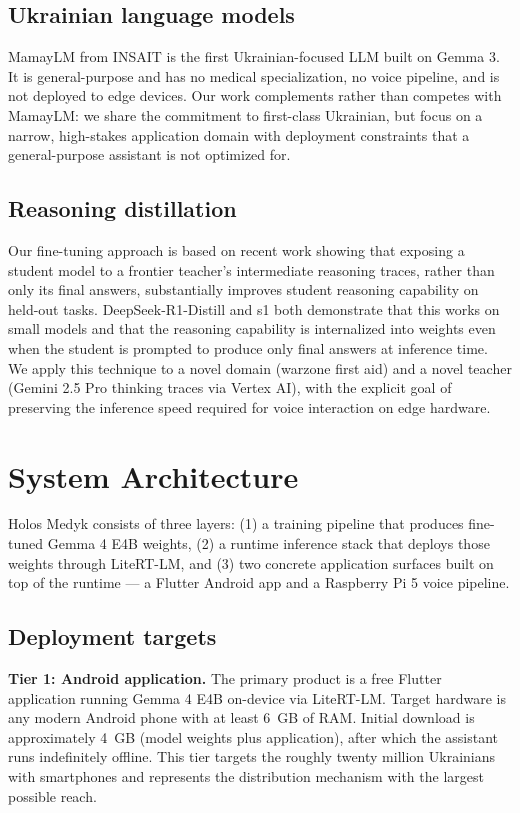 \documentclass{article}
\theoremstyle{plain}
\theoremstyle{definition}
\theoremstyle{remark}
\begin{document}
\subsection{Ukrainian language models}

MamayLM from INSAIT is the first Ukrainian-focused LLM built on Gemma 3. It is general-purpose and has no medical specialization, no voice pipeline, and is not deployed to edge devices. Our work complements rather than competes with MamayLM: we share the commitment to first-class Ukrainian, but focus on a narrow, high-stakes application domain with deployment constraints that a general-purpose assistant is not optimized for.

\subsection{Reasoning distillation}

Our fine-tuning approach is based on recent work showing that exposing a student model to a frontier teacher's intermediate reasoning traces, rather than only its final answers, substantially improves student reasoning capability on held-out tasks. DeepSeek-R1-Distill and s1 both demonstrate that this works on small models and that the reasoning capability is internalized into weights even when the student is prompted to produce only final answers at inference time. We apply this technique to a novel domain (warzone first aid) and a novel teacher (Gemini 2.5 Pro thinking traces via Vertex AI), with the explicit goal of preserving the inference speed required for voice interaction on edge hardware.

\section{System Architecture}

Holos Medyk consists of three layers: (1) a training pipeline that produces fine-tuned Gemma 4 E4B weights, (2) a runtime inference stack that deploys those weights through LiteRT-LM, and (3) two concrete application surfaces built on top of the runtime --- a Flutter Android app and a Raspberry Pi 5 voice pipeline.

\subsection{Deployment targets}

\textbf{Tier 1: Android application.} The primary product is a free Flutter application running Gemma 4 E4B on-device via LiteRT-LM. Target hardware is any modern Android phone with at least 6~GB of RAM. Initial download is approximately 4~GB (model weights plus application), after which the assistant runs indefinitely offline. This tier targets the roughly twenty million Ukrainians with smartphones and represents the distribution mechanism with the largest possible reach.
\end{document}
